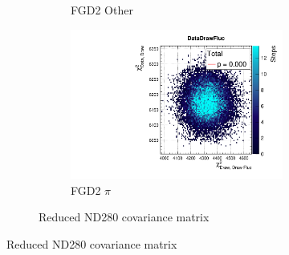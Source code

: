 \begin{figure}[h]
\begin{subfigure}[t]{\textwidth}
\begin{subfigure}[t]{0.32\textwidth}
\caption*{FGD2 Other}
\end{subfigure}
\begin{subfigure}[t]{0.32\textwidth}
\includegraphics[width=\textwidth, trim={20mm 6mm 4mm 11mm}, clip,page=88]{figures/mach3/2018/data/2018a_FixedCov_RedCov_Mpi_Data_merge_PostPredStore_FullLLH_procs}
\caption*{FGD2 $\pi$}
\end{subfigure}
\caption{Reduced ND280 covariance matrix}
\end{subfigure}


\end{figure}
